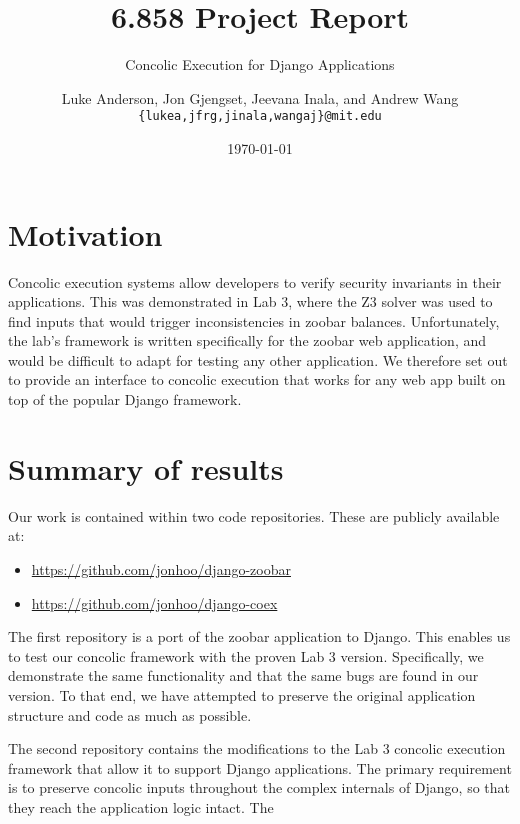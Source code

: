 \documentclass{scrartcl}
\author{
Luke Anderson, Jon Gjengset, Jeevana Inala, and Andrew Wang \\
\texttt{\{lukea,jfrg,jinala,wangaj\}@mit.edu}
}
\title{6.858 Project Report}
\subtitle{Concolic Execution for Django Applications}
\date{\today}
\begin{document}
\maketitle


\section{Motivation}

Concolic execution systems allow developers to verify security
invariants in their applications. This was demonstrated in Lab 3,
where the Z3 solver was used to find inputs that would trigger
inconsistencies in zoobar balances. Unfortunately, the lab's
framework is written specifically for the zoobar web application, and
would be difficult to adapt for testing any other application. We
therefore set out to provide an interface to concolic execution that
works for any web app built on top of the popular Django framework.


\section{Summary of results}

Our work is contained within two code repositories. These are
publicly available at:
\begin{itemize}
\item \url{https://github.com/jonhoo/django-zoobar}
\item \url{https://github.com/jonhoo/django-coex}
\end{itemize}

The first repository is a port of the zoobar application to Django.
This enables us to test our concolic framework with the proven Lab 3
version. Specifically, we demonstrate the same functionality and that
the same bugs are found in our version. To that end, we have attempted
to preserve the original application structure and code as much as
possible.




The second repository contains the modifications to the Lab 3 concolic
execution framework that allow it to support Django applications. The
primary requirement is to preserve concolic inputs throughout the
complex internals of Django, so that they reach the application logic
intact. The 
\end{document}
